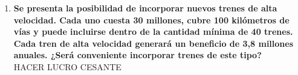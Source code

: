 \documentclass[10pt, a4paper, titlepage,
	oneside,
	fleqn, leqno]{article}
\begin{document}
\begin{enumerate} [a .]
\item \textbf{Se presenta la posibilidad de incorporar nuevos trenes de alta velocidad. Cada uno cuesta 30 millones, cubre 100 kilómetros de vías y puede incluirse dentro de la cantidad mínima de 40 trenes. Cada tren de alta velocidad generará un beneficio de 3,8 millones anuales. ¿Será conveniente incorporar trenes de este tipo?}\\
HACER LUCRO CESANTE
\end{enumerate}

\appendix

\end{document}
